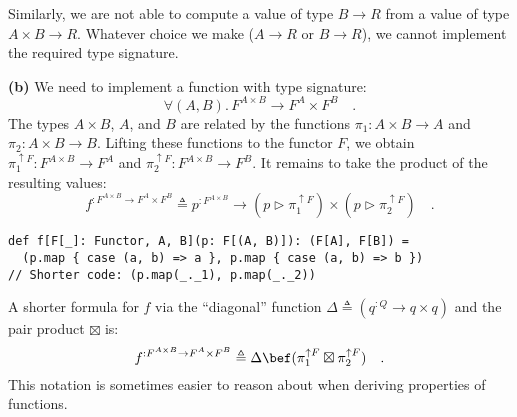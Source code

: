 Similarly, we are not able to compute a value of type $B\rightarrow R$
from a value of type $A\times B\rightarrow R$. Whatever choice we
make ($A\rightarrow R$ or $B\rightarrow R$), we cannot implement
the required type signature.

\textbf{(b)} We need to implement a function with type signature:
\[
\forall(A,B).\,F^{A\times B}\rightarrow F^{A}\times F^{B}\quad.
\]
The types $A\times B$, $A$, and $B$ are related by the functions
$\pi_{1}:A\times B\rightarrow A$ and $\pi_{2}:A\times B\rightarrow B$.
Lifting these functions to the functor $F$, we obtain $\pi_{1}^{\uparrow F}:F^{A\times B}\rightarrow F^{A}$
and $\pi_{2}^{\uparrow F}:F^{A\times B}\rightarrow F^{B}$. It remains
to take the product of the resulting values:
\[
f^{:F^{A\times B}\rightarrow F^{A}\times F^{B}}\triangleq p^{:F^{A\times B}}\rightarrow(p\triangleright\pi_{1}^{\uparrow F})\times(p\triangleright\pi_{2}^{\uparrow F})\quad.
\]
\begin{lstlisting}
def f[F[_]: Functor, A, B](p: F[(A, B)]): (F[A], F[B]) =
  (p.map { case (a, b) => a }, p.map { case (a, b) => b })
// Shorter code: (p.map(_._1), p.map(_._2))
\end{lstlisting}
A shorter formula for $f$ via the \textsf{``}diagonal\textsf{''} function $\Delta\triangleq(q^{:Q}\rightarrow q\times q)$
and the pair product $\boxtimes$ is:
\[
f^{:F^{A\times B}\rightarrow F^{A}\times F^{B}}\triangleq\Delta\bef(\pi_{1}^{\uparrow F}\boxtimes\pi_{2}^{\uparrow F})\quad.
\]
This notation is sometimes easier to reason about when deriving properties
of functions.

